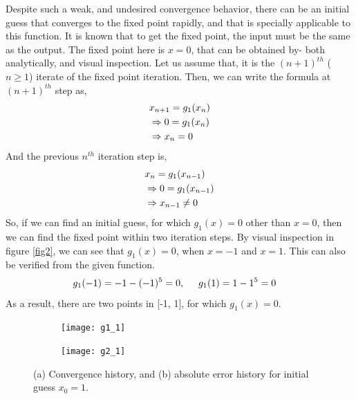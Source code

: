 \documentclass[11pt]{article} %
\begin{document}
Despite such a weak, and undesired convergence behavior, there can be an initial guess that converges to the fixed point rapidly, and that is specially applicable to this function. It is known that to get the fixed point, the input must be the same as the output. The fixed point here is $x = 0$, that can be obtained by- both analytically, and visual inspection. Let us assume that, it is the $(n+1)^{th}$ ($n \geq 1$) iterate of the fixed point iteration. Then, we can write the formula  at $(n+1)^{th}$ step as,
\begin{equation}
\begin{split}
\centering
&x_{n+1} = g_1(x_n)\\
&\Rightarrow 0 = g_1(x_n)\\
&\Rightarrow x_n = 0\\
\label{eq9}
\end{split}
\end{equation}
And the previous $n^{th}$ iteration step is,
\begin{equation}
\begin{split}
\centering
&x_{n} = g_1(x_{n-1})\\
&\Rightarrow 0 = g_1(x_{n-1})\\
&\Rightarrow x_{n-1} \neq 0\\
\label{eq10}
\end{split}
\end{equation}
So, if we can find an initial guess, for which  $g_1(x) = 0$ other than $x = 0$, then we can find the fixed point within two iteration steps. By visual inspection in figure \ref{fig2}, we can see that $g_1(x) = 0$, when $x = -1$ and $x = 1$. This can also be verified from the given function.
\begin{equation}
\begin{split}
\centering
&g_1(-1) = -1 - (-1)^5 = 0, \hspace{0.5cm} g_1(1) = 1 - 1^5 = 0
\label{eq11}
\end{split}
\end{equation}
As a result, there are two points in [-1, 1], for which $g_1(x) = 0$.
\begin{figure}[!htb]
    \centering
    \begin{subfigure}{.5\textwidth}
        \centering
        \texttt{[image: g1\_1]}
        \caption{}
        \label{fig7a}
    \end{subfigure}\hfill
    \begin{subfigure}{0.5\textwidth}
        \centering
        \texttt{[image: g2\_1]}
        \caption{}
        \label{fig7b}
    \end{subfigure}
    \caption{(a) Convergence history, and (b) absolute error history for initial guess $x_0 = 1$.}
    \label{fig7}
\end{figure}
\end{document}
